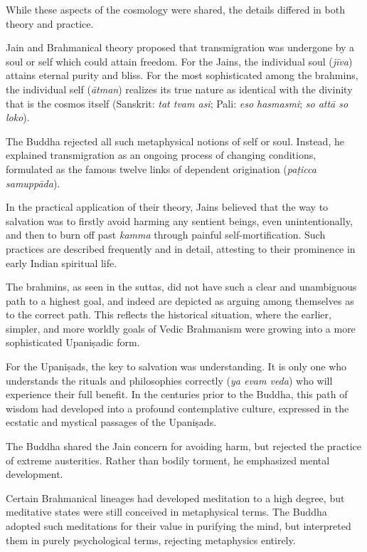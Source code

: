 \documentclass[12pt,openany]{book}%
\begin{document}
While these aspects of the cosmology were shared, the details differed in both theory and practice.

Jain and Brahmanical theory proposed that transmigration was undergone by a soul or self which could attain freedom. For the Jains, the individual soul (\textit{\textsanskrit{jīva}}) attains eternal purity and bliss. For the most sophisticated among the brahmins, the individual self (\textit{\textsanskrit{ātman}}) realizes its true nature as identical with the divinity that is the cosmos itself (Sanskrit: \textit{tat tvam asi}; Pali: \textit{eso hasmasmi}; \textit{so \textsanskrit{attā} so loko}).

The Buddha rejected all such metaphysical notions of self or soul. Instead, he explained transmigration as an ongoing process of changing conditions, formulated as the famous twelve links of dependent origination (\textit{\textsanskrit{paṭicca} \textsanskrit{samuppāda}}).

In the practical application of their theory, Jains believed that the way to salvation was to firstly avoid harming any sentient beings, even unintentionally, and then to burn off past \textit{kamma} through painful self-mortification. Such practices are described frequently and in detail, attesting to their prominence in early Indian spiritual life.

The brahmins, as seen in the suttas, did not have such a clear and unambiguous path to a highest goal, and indeed are depicted as arguing among themselves as to the correct path. This reflects the historical situation, where the earlier, simpler, and more worldly goals of Vedic Brahmanism were growing into a more sophisticated \textsanskrit{Upaniṣadic} form.

For the \textsanskrit{Upaniṣads}, the key to salvation was understanding. It is only one who understands the rituals and philosophies correctly (\textit{ya evam veda}) who will experience their full benefit. In the centuries prior to the Buddha, this path of wisdom had developed into a profound contemplative culture, expressed in the ecstatic and mystical passages of the \textsanskrit{Upaniṣads}.

The Buddha shared the Jain concern for avoiding harm, but rejected the practice of extreme austerities. Rather than bodily torment, he emphasized mental development.

Certain Brahmanical lineages had developed meditation to a high degree, but meditative states were still conceived in metaphysical terms. The Buddha adopted such meditations for their value in purifying the mind, but interpreted them in purely psychological terms, rejecting metaphysics entirely.
\end{document}
